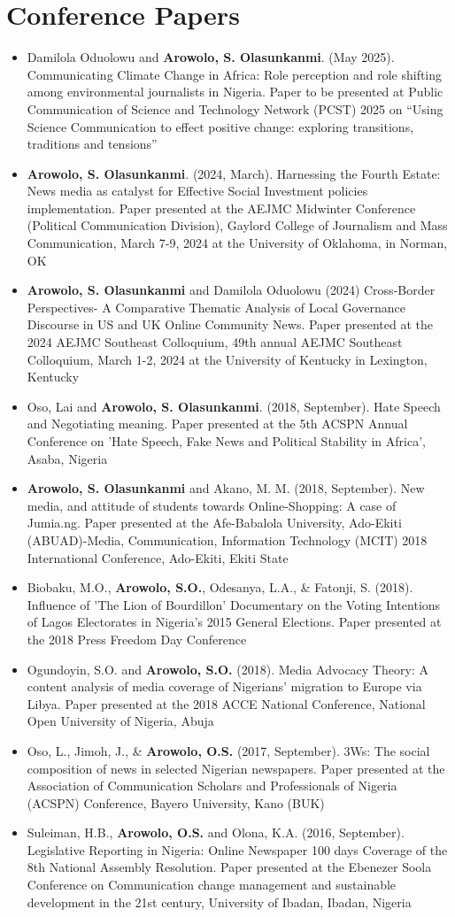 \documentclass[a4paper,11pt]{article}
\newcommand{\resumeItem}[1]{
  \item\small{
    {#1 \vspace{-2pt}}
  }
}
\newcommand{\resumeItemListStart}{\begin{itemize}}
\newcommand{\resumeItemListEnd}{\end{itemize}\vspace{-5pt}}
\begin{document}
\section{Conference Papers}
    \resumeItemListStart
        \resumeItem{Damilola Oduolowu and \textbf{Arowolo, S. Olasunkanmi}. (May 2025). Communicating Climate Change in Africa: Role perception and role shifting among environmental journalists in Nigeria. Paper to be presented at Public Communication of Science and Technology Network (PCST) 2025 on ``Using Science Communication to effect positive change: exploring transitions, traditions and tensions''}
        \resumeItem{\textbf{Arowolo, S. Olasunkanmi}. (2024, March). Harnessing the Fourth Estate: News media as catalyst for Effective Social Investment policies implementation. Paper presented at the AEJMC Midwinter Conference (Political Communication Division), Gaylord College of Journalism and Mass Communication, March 7-9, 2024 at the University of Oklahoma, in Norman, OK}
        \resumeItem{\textbf{Arowolo, S. Olasunkanmi} and Damilola Oduolowu (2024) Cross-Border Perspectives- A Comparative Thematic Analysis of Local Governance Discourse in US and UK Online Community News. Paper presented at the 2024 AEJMC Southeast Colloquium, 49th annual AEJMC Southeast Colloquium, March 1-2, 2024 at the University of Kentucky in Lexington, Kentucky}
        \resumeItem{Oso, Lai and \textbf{Arowolo, S. Olasunkanmi}. (2018, September). Hate Speech and Negotiating meaning. Paper presented at the 5th ACSPN Annual Conference on 'Hate Speech, Fake News and Political Stability in Africa', Asaba, Nigeria}
        \resumeItem{\textbf{Arowolo, S. Olasunkanmi} and Akano, M. M. (2018, September). New media, and attitude of students towards Online-Shopping: A case of Jumia.ng. Paper presented at the Afe-Babalola University, Ado-Ekiti (ABUAD)-Media, Communication, Information Technology (MCIT) 2018 International Conference, Ado-Ekiti, Ekiti State}
        \resumeItem{Biobaku, M.O., \textbf{Arowolo, S.O.}, Odesanya, L.A., \& Fatonji, S. (2018). Influence of 'The Lion of Bourdillon' Documentary on the Voting Intentions of Lagos Electorates in Nigeria's 2015 General Elections. Paper presented at the 2018 Press Freedom Day Conference}
        \resumeItem{Ogundoyin, S.O. and \textbf{Arowolo, S.O.} (2018). Media Advocacy Theory: A content analysis of media coverage of Nigerians' migration to Europe via Libya. Paper presented at the 2018 ACCE National Conference, National Open University of Nigeria, Abuja}
        \resumeItem{Oso, L., Jimoh, J., \& \textbf{Arowolo, O.S.} (2017, September). 3Ws: The social composition of news in selected Nigerian newspapers. Paper presented at the Association of Communication Scholars and Professionals of Nigeria (ACSPN) Conference, Bayero University, Kano (BUK)}
        \resumeItem{Suleiman, H.B., \textbf{Arowolo, O.S.} and Olona, K.A. (2016, September). Legislative Reporting in Nigeria: Online Newspaper 100 days Coverage of the 8th National Assembly Resolution. Paper presented at the Ebenezer Soola Conference on Communication change management and sustainable development in the 21st century, University of Ibadan, Ibadan, Nigeria}
    \resumeItemListEnd
\end{document}
